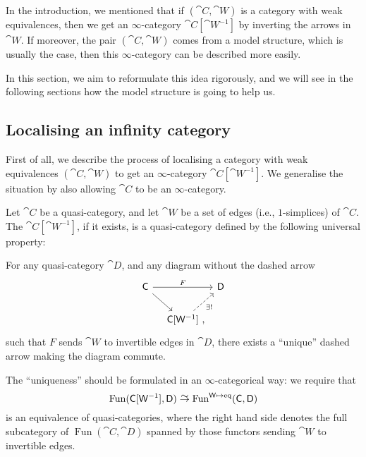 In the introduction, we mentioned that
if $(\cat{C},\cat{W})$ is a category with weak equivalences,
then we get an $\infty$-category $\cat{C}[\cat{W}^{-1}]$
by inverting the arrows in $\cat{W}$.
If moreover, the pair $(\cat{C},\cat{W})$ comes from a model structure,
which is usually the case,
then this $\infty$-category can be described more easily.

In this section, we aim to reformulate this idea rigorously,
and we will see in the following sections
how the model structure is going to help us.

\subsection{Localising an infinity category}

First of all, we describe the process of localising
a category with weak equivalences $(\cat{C},\cat{W})$
to get an $\infty$-category $\cat{C}[\cat{W}^{-1}]$.
We generalise the situation by also allowing $\cat{C}$ to be an $\infty$-category.

\begin{definition}
    Let $\cat{C}$ be a quasi-category,
    and let $\cat{W}$ be a set of edges (i.e., $1$-simplices) of $\cat{C}$.
    The  $\cat{C}[\cat{W}^{-1}]$, if it exists,
    is a quasi-category defined by the following universal property:
    \begin{itms}
        \item For any quasi-category $\cat{D}$, and any diagram without the dashed arrow 
        \[ \begin{tikzcd} [column sep=1em]
            \cat{C} \ar[rr,"F"] \ar[dr] && \cat{D} \\
            & \cat{C}[\cat{W}^{-1}] \rlap{\ ,} \ar[ur,dashed,"\exists!"']
        \end{tikzcd} \]
        such that $F$ sends $\cat{W}$ to invertible edges in $\cat{D}$,
        there exists a ``unique'' dashed arrow making the diagram commute.
    \end{itms}
    The ``uniqueness'' should be formulated in an $\infty$-categorical way:
    we require that
    \[ \operatorname{Fun}(\cat{C}[\cat{W}^{-1}], \cat{D}) \simto
        \operatorname{Fun}^{\cat{W}\mapsto\mathrm{eq}}(\cat{C},\cat{D}) \]
    is an equivalence of quasi-categories,
    where the right hand side denotes the full subcategory of $\operatorname{Fun}(\cat{C},\cat{D})$
    spanned by those functors sending $\cat{W}$ to invertible edges.
\end{definition}

